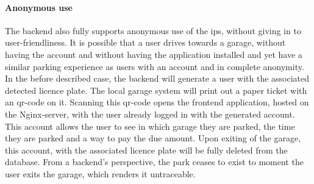 \paragraph{Anonymous use}
The backend also fully supports anonymous use of the \ac{ips}, without giving in to user-friendliness. 
It is possible that a user drives towards a garage, without having the account and without having the application installed and yet have a similar parking experience as users with an account and in complete anonymity. In the before described case, the backend will generate a user with the associated detected licence plate. The local garage system will print out a paper ticket with an \ac{qr}-code on it. Scanning this \ac{qr}-code opens the frontend application, hosted on the Nginx-server, with the user already logged in with the generated account.  This account allows the user to see in which garage they are parked, the time they are parked and a way to pay the due amount. Upon exiting of the garage, this account, with the associated licence plate will be fully deleted from the database. From a backend's perspective, the park ceases to exist to moment the user exits the garage, which renders it untraceable.
